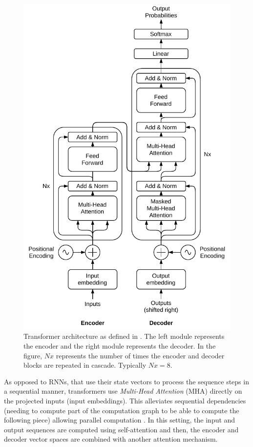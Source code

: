 \begin{figure}
	\centering
	\includegraphics[width=0.8\linewidth]{chapter2/images/transformer}
	\caption{Transformer architecture as defined in \autocite{vaswani2017}. The left module represents the encoder and the right module represents the decoder. In the figure, $Nx$ represents the number of times the encoder and decoder blocks are repeated in cascade. Typically $Nx=8$. }
	\label{fig:transformer}
\end{figure}

As opposed to RNNs, that use their state vectors to process the sequence steps in a sequential manner, transformers use \textit{Multi-Head Attention} (MHA) directly on the projected inputs (input embeddings). This alleviates sequential dependencies (needing to compute part of the computation graph to be able to compute the following piece) allowing parallel computation \autocite{uday2019}. In this setting, the input and output sequences are computed using self-attention and then, the encoder and decoder vector spaces are combined with another attention mechanism.

